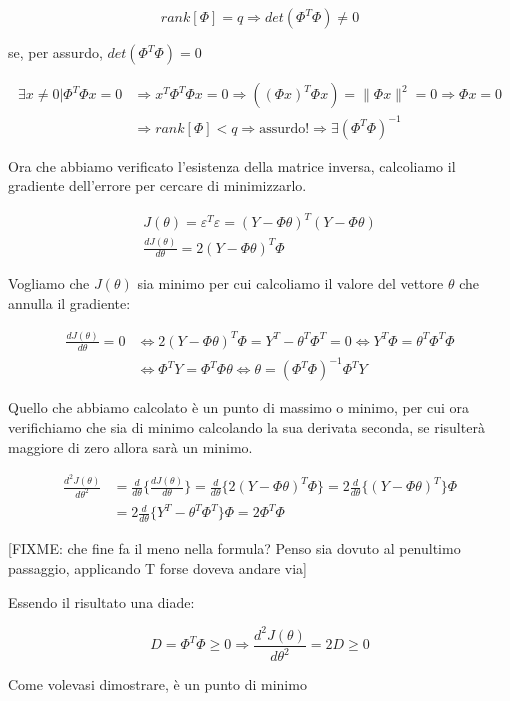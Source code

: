 \begin{dimostrazione}

  \[ rank[\Phi]=q \Longrightarrow det(\Phi^T\Phi) \ne 0 \]
  
se, per assurdo, $det(\Phi^T\Phi)=0$

  \[ 
    \begin{split}
      \exists x \ne 0 | \Phi^T\Phi x=0 &\Longrightarrow x^T\Phi^T\Phi x=0 \Longrightarrow ((\Phi x)^T\Phi x)=\| \Phi x \|^2 =0 \Longrightarrow \Phi x =0\\
       &\Longrightarrow rank[\Phi]<q \Longrightarrow \text{assurdo!} \Longrightarrow \exists (\Phi^T\Phi)^{-1} 
    \end{split} 
  \]
  
Ora che abbiamo verificato l'esistenza della matrice inversa, calcoliamo il gradiente dell'errore per cercare di minimizzarlo.

  \begin{gather*}
    J(\theta)=\varepsilon^T\varepsilon=(Y-\Phi\theta)^T(Y-\Phi\theta)\\
    \frac{dJ(\theta)}{d\theta}=2(Y-\Phi\theta)^T\Phi
  \end{gather*}
  
Vogliamo che $J(\theta)$ sia minimo per cui calcoliamo il valore del vettore $\theta$ che annulla il gradiente:

  \[ 
    \begin{split}\frac{dJ(\theta)}{d\theta} = 0 &\Leftrightarrow  2(Y-\Phi\theta)^T\Phi=Y^T-\theta^T\Phi^T=0 \Leftrightarrow Y^T\Phi=\theta^T\Phi^T\Phi \\ &\Leftrightarrow \Phi^TY=\Phi^T\Phi\theta \Leftrightarrow \theta= (\Phi^T\Phi)^{-1}\Phi^TY 
    \end{split}
  \]
  
Quello che abbiamo calcolato è un punto di massimo o minimo, per cui ora verifichiamo che sia di minimo calcolando la sua derivata seconda, se risulterà maggiore di zero allora sarà un minimo.

  \[ 
    \begin{split} \frac{d^2J(\theta)}{d\theta^2}&=\frac{d}{d\theta}\{\frac{dJ(\theta)}{d\theta}\}= \frac{d}{d\theta}\{2(Y-\Phi\theta)^T\Phi\}=2\frac{d}{d\theta}\{(Y-\Phi\theta)^T\}\Phi\\
  &=2\frac{d}{d\theta}\{Y^T-\theta^T\Phi^T\}\Phi=2\Phi^T\Phi 
    \end{split} 
  \] 
  
\begin{center}[FIXME: che fine fa il meno nella formula? Penso sia dovuto al penultimo passaggio, applicando T forse doveva andare via]\end{center}

Essendo il risultato una diade:

  \[ D=\Phi^T\Phi \geq 0 \Longrightarrow \frac{d^2J(\theta)}{d\theta^2}=2D \geq 0 \]
  
Come volevasi dimostrare, è un punto di minimo
\end{dimostrazione}

